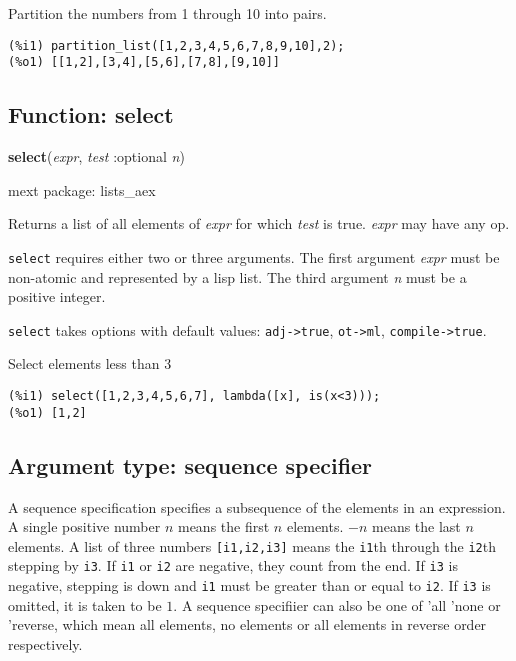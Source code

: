\documentclass[]{article}
\begin{document}
\vspace{5 pt}


   Partition the numbers from 1 through 10 into pairs. 

\begin{Verbatim}[frame=single]
(%i1) partition_list([1,2,3,4,5,6,7,8,9,10],2);
(%o1) [[1,2],[3,4],[5,6],[7,8],[9,10]]
\end{Verbatim}


\subsection{Function: select\label{sec:select}}
\hypertarget{select}{}
{\bf select}({\it expr}, {\it test} :optional {\it n})


\noindent mext package: lists\_aex



\vspace{5 pt}
Returns a list of all elements of {\it expr} for which {\it test} is true. {\it expr} may have any op. 

\vspace{5 pt}

   {\tt select} requires either two or three arguments.
    The first argument {\it expr} must be non-atomic and represented by a lisp list.
    The third argument {\it n} must be a positive integer.


\vspace{5 pt}

{\tt select} takes options with default values: {\tt adj->true}, {\tt ot->ml}, {\tt compile->true}.
\vspace{5 pt}


   Select elements less than 3 

\begin{Verbatim}[frame=single]
(%i1) select([1,2,3,4,5,6,7], lambda([x], is(x<3)));
(%o1) [1,2]
\end{Verbatim}


\subsection{Argument type: sequence specifier\label{sec:sequence specifier}}
\hypertarget{sequence specifier}{}



\vspace{5 pt}
A sequence specification specifies a subsequence of the elements in an expression. A single positive number $n$ means the first $n$ elements. $-n$ means the last $n$ elements. A list of three numbers \verb#[i1,i2,i3]# means the \verb#i1#th through the \verb#i2#th stepping by \verb#i3#. If \verb#i1# 
or \verb#i2# are negative, they count from the end. If \verb#i3# is negative, stepping is down and \verb#i1# must be greater than or equal to \verb#i2#. If \verb#i3# is omitted, it is taken to be $1$. A sequence specifiier can also be one of 'all 'none or 'reverse, which mean all elements, no 
elements or all elements in reverse order respectively. 
\end{document}
